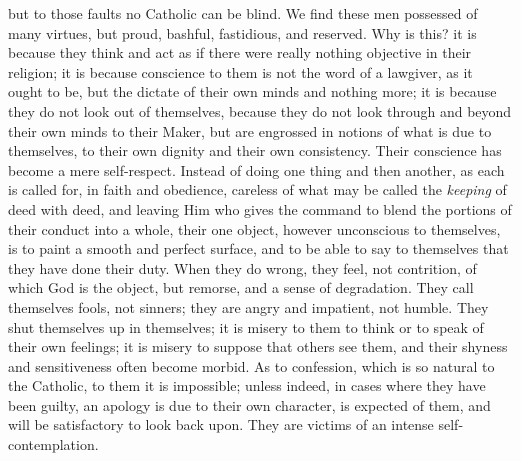 but to those faults no Catholic can be blind. We find these men
possessed of many virtues, but proud, bashful, fastidious, and
reserved. Why is this? it is because they think and act as if there
were really nothing objective in their religion; it is because
conscience to them is not the word of a lawgiver, as it ought to be,
but the dictate of their own minds and nothing more; it is because
they do not look out of themselves, because they do not look through
and beyond their own minds to their Maker, but are engrossed in
notions of what is due to themselves, to their own dignity and their
own consistency. Their conscience has become a mere self-respect.
Instead of doing one thing and then another, as each is called for, in
faith and obedience, careless of what may be called the \emph{keeping}
of deed with deed, and leaving Him who gives the command to blend the
portions of their conduct into a whole, their one object, however
unconscious to themselves, is to paint a smooth and perfect surface,
and to be able to say to themselves that they have done their duty.
When they do wrong, they feel, not contrition, of which God is the
object, but remorse, and a sense of degradation. They call themselves
fools, not sinners; they are angry and impatient, not humble. They
shut themselves up in themselves; it is misery to them to think or to
speak of their own feelings; it is misery to suppose that others see
them, and their shyness and sensitiveness often become morbid. As to
confession, which is so natural to the Catholic, to them it is
impossible; unless indeed, in cases where they have been guilty, an
apology is due to their own character, is expected of them, and will
be satisfactory to look back upon. They are victims of an intense
self-contemplation.

